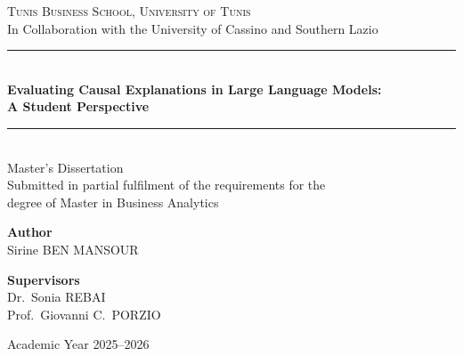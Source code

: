 \begin{titlepage}
  \centering
  \vspace*{1cm}

  {\large\scshape Tunis Business School, University of Tunis}\\[0.3cm]
  {\normalsize In Collaboration with the University of Cassino and Southern Lazio}\\[2cm]

  \rule{\linewidth}{0.4pt}\\[0.4cm]
  {\LARGE\bfseries Evaluating Causal Explanations in Large Language Models:\\[0.3cm]
  A Student Perspective}\\[0.4cm]
  \rule{\linewidth}{0.4pt}\\[2cm]

  {\large Master's Dissertation}\\[0.5cm]
  {\normalsize Submitted in partial fulfilment of the requirements for the\\
  degree of Master in Business Analytics}\\[2.5cm]

  \begin{minipage}[t]{0.45\textwidth}
    \raggedright
    \textbf{Author}\\
    Sirine BEN MANSOUR
  \end{minipage}
  \hfill
  \begin{minipage}[t]{0.45\textwidth}
    \raggedleft
    \textbf{Supervisors}\\
    Dr.\ Sonia REBAI\\
    Prof.\ Giovanni C.\ PORZIO
  \end{minipage}

  \vfill

  {\normalsize Academic Year 2025--2026}

\end{titlepage}
